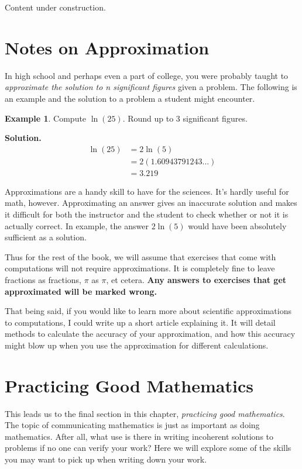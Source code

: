 \documentclass{scrbook}
\theoremstyle{definition}
\newtheorem{example}{Example}
\begin{document}
Content under construction.

\section{Notes on Approximation}

In high school and perhaps even a part of college, you were probably taught to \textit{approximate the solution to n significant figures} given a problem. The following is an example and the solution to a problem a student might encounter.

\begin{example}
Compute $\ln(25)$. Round up to 3 significant figures.
\end{example}
\textbf{Solution.}
\begin{align*}
    \ln(25) &= 2\ln(5)\\
            &= 2(1.60943791243...)\\
            &= 3.219
\end{align*}

Approximations are a handy skill to have for the sciences. It's hardly useful for math, however. Approximating an answer gives an inaccurate solution and makes it difficult for both the instructor and the student to check whether or not it is actually correct. In example, the answer $2\ln(5)$ would have been absolutely sufficient as a solution. 

Thus for the rest of the book, we will assume that exercises that come with computations will not require approximations. It is completely fine to leave fractions as fractions, $\pi$ as $\pi$, et cetera. \textbf{Any answers to exercises that get approximated will be marked wrong.}

That being said, if you would like to learn more about scientific approximations to computations, I could write up a short article explaining it. It will detail methods to calculate the accuracy of your approximation, and how this accuracy might blow up when you use the approximation for different calculations.

\section{Practicing Good Mathematics}

This leads us to the final section in this chapter, \textit{practicing good mathematics}. The topic of communicating mathematics is just as important as doing mathematics. After all, what use is there in writing incoherent solutions to problems if no one can verify your work? Here we will explore some of the skills you may want to pick up when writing down your work.
\end{document}
